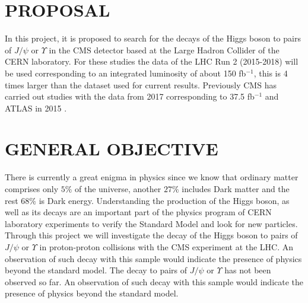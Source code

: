 \documentclass[final,3p]{CSP}
\begin{document}
\newpage
\fi
\section{PROPOSAL}

\onehalfspacing In this project, it is proposed to search for the decays of the Higgs boson to pairs of $J/\psi$ or $\Upsilon$ in the CMS detector based at the Large Hadron Collider of the CERN laboratory. For these studies the data of the LHC Run 2 (2015-2018) will be used corresponding to an integrated luminosity of about 150 fb$^{-1}$, this is 4 times larger than the dataset used for current results. Previously CMS has carried out studies with the data from 2017 \cite{2019134811} corresponding to 37.5 fb$^{-1}$ and ATLAS in 2015 .
    


\section{GENERAL OBJECTIVE}

\onehalfspacing There is currently a great enigma in physics since we know that ordinary matter comprises only $5\%$ of the universe, another $27\%$ includes Dark matter and the rest $68\%$ is Dark energy.
Understanding the production of the Higgs boson, as well as its decays are an important part of the physics program of CERN laboratory experiments to verify the Standard Model and look for new particles. Through this project we will investigate the decay of the Higgs boson to pairs of $J/\psi$ or $\Upsilon$ in proton-proton collisions with the CMS experiment at the LHC. An observation of such decay  with this sample would indicate the presence of physics beyond the standard model. The decay to pairs of $J/\psi$ or $\Upsilon$ has not been observed so far. An observation of such decay  with this sample would indicate the presence of physics beyond the standard model. 
\end{document}
